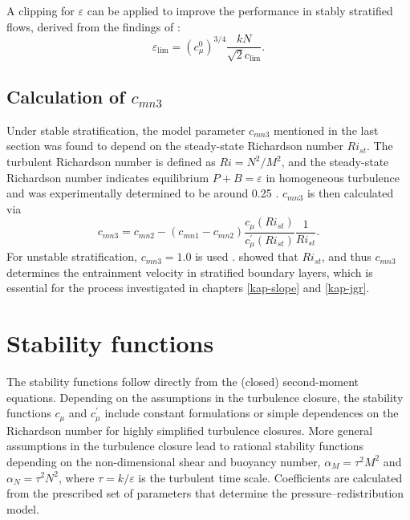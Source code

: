 A clipping for $\varepsilon$ can be applied to improve the performance in 
stably stratified flows, derived from the findings of \citep{Galperin1988}:
\begin{equation}
 \label{galperin}
 \varepsilon_{\lim} = (c_\mu^0)^{3 \slash 4} \frac{kN}{\sqrt{2} c_{\lim}}.
\end{equation}

\subsection{Calculation of $c_{mn3}$ }

Under stable stratification, the model parameter $c_{mn3}$ mentioned in the 
last section was found to depend on the steady-state Richardson number 
$Ri_{st}$. The turbulent Richardson number is defined as $Ri = N^2 \slash 
M^2$, and the steady-state Richardson number indicates equilibrium $P + 
B = \varepsilon$ in homogeneous 
turbulence and was experimentally determined to be around 0.25 
\citep[][]{UmlaufBurchard2005a}. $c_{mn3}$ is then calculated via
\begin{equation}
 \label{cmn3}
 c_{mn3} = c_{mn2} - (c_{mn1} - c_{mn2}) \frac{c_\mu(Ri_{st})}{c_\mu^ \prime 
(Ri_{st})} \frac{1}{Ri_{st}}.
\end{equation}
For unstable stratification, $c_{mn3} = 1.0$ is used \citep[][]{Rodi1987}. 
\cite{UmlaufBurchard2005a} showed that $Ri_{st}$, and thus $c_{mn3}$ determines 
the entrainment velocity in stratified boundary layers, which is essential for 
the process investigated in chapters \ref{kap-slope} and \ref{kap-jgr}.

\section{Stability functions}

The stability functions follow directly from the (closed) second-moment 
equations. Depending on the assumptions in the turbulence closure, the 
stability functions $c_\mu$ and $c_\mu^\prime$ include 
constant formulations or simple dependences on the Richardson number for 
highly simplified turbulence closures. More
general assumptions in the turbulence closure lead to rational stability 
functions depending on the non-dimensional shear and buoyancy number, $\alpha_M 
= \tau^2 M^2$ and $\alpha_N = \tau^2 N^2$, where $\tau = k \slash \varepsilon $ 
is the turbulent 
time scale. Coefficients are calculated from the prescribed set of parameters 
that determine the pressure--redistribution model.


